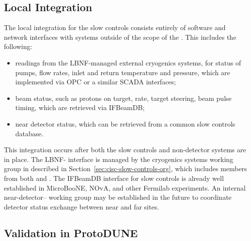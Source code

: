 \subsection{Local Integration}
\label{sec:fdgen-slow-cryo-slow-loc-integ}


The local integration for the slow controls consists entirely of software
and network interfaces with systems outside of the scope of the .
This includes the following:
\begin{itemize}
\item readings from the LBNF-managed external cryogenics systems, for status of pumps, flow rates, inlet and return temperature and pressure, which are implemented via OPC or a similar SCADA interfaces;
\item beam status, such as protons on target, rate, target steering, beam pulse timing, which are retrieved via IFBeamDB;
\item near detector status, which can be retrieved from a common slow controls database.
\end{itemize}

This integration occurs after both the slow controls and non-detector
systems are in place.  The LBNF- interface is managed by the
cryogenics systems working group in  described in Section~\ref{sec:cisc-slow-controls-org}, which includes members from both  and . %
The IFBeamDB interface for slow controls is already well established in MicroBooNE, NOvA, and other Fermilab experiments. An internal near-detector-- working group may be established in the future
to coordinate detector status exchange between near and far sites.

\subsection{Validation in ProtoDUNE}
\label{sec:cisc-slow-control-pdsp}

